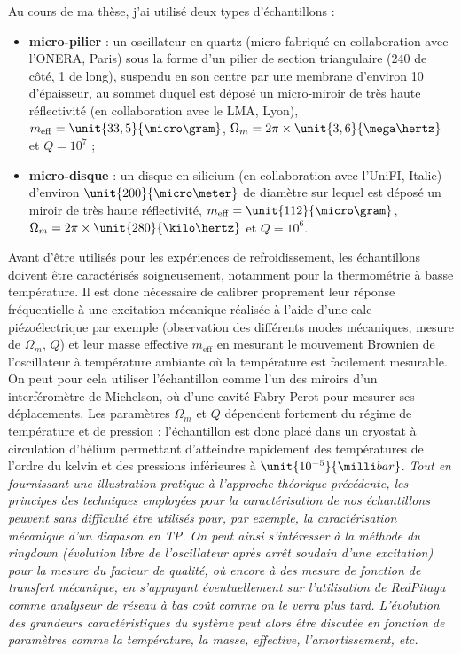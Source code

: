\documentclass[12pt,a4paper]{article}
\begin{document}
Au cours de ma thèse, j'ai utilisé deux types d'échantillons :
\begin{itemize}
\item \textbf{micro-pilier} : un oscillateur en quartz (micro-fabriqué en collaboration avec l'ONERA, Paris) sous la forme d'un pilier de section triangulaire (\unit{240}{\micro\meter} de côté, \unit{1}{\milli\meter} de long), suspendu en son centre par une membrane d'environ \unit{10}{\micro\meter} d'épaisseur, au sommet duquel est déposé un micro-miroir de très haute réflectivité (en collaboration avec le LMA, Lyon), $m_\mathrm{eff}=\unit{33,5}{\micro\gram}$, $\Omega_m=2\pi\times\unit{3,6}{\mega\hertz}$ et $Q=10^7$ ;
\item \textbf{micro-disque} : un disque en silicium (en collaboration avec l'UniFI, Italie) d'environ $\unit{200}{\micro\meter}$ de diamètre sur lequel est déposé un miroir de très haute réflectivité, $m_\mathrm{eff}=\unit{112}{\micro\gram}$, $\Omega_m=2\pi\times\unit{280}{\kilo\hertz}$ et $Q=10^6$.
\end{itemize}
Avant d'être utilisés pour les expériences de refroidissement, les échantillons doivent être caractérisés soigneusement, notamment pour la thermométrie à basse température.
Il est donc nécessaire de calibrer proprement leur réponse fréquentielle à une excitation mécanique réalisée à l'aide d'une cale piézoélectrique par exemple (observation des différents modes mécaniques, mesure de $\Omega_m$, $Q$) et leur masse effective $m_\mathrm{eff}$ en mesurant le mouvement Brownien de l'oscillateur à température ambiante où la température est facilement mesurable.
On peut pour cela utiliser l'échantillon comme l'un des miroirs d'un interféromètre de Michelson, où d'une cavité Fabry Perot pour mesurer ses déplacements.
Les paramètres $\Omega_m$ et $Q$ dépendent fortement du régime de température et de pression  : l'échantillon est donc placé dans un cryostat à circulation d'hélium permettant d'atteindre rapidement des températures de l'ordre du kelvin et des pressions inférieures à $\unit{10^{-5}}{\milli bar}$.
\emph{Tout en fournissant une illustration pratique à l'approche théorique précédente, les principes des techniques employées pour la caractérisation de nos échantillons peuvent sans difficulté être utilisés pour, par exemple, la caractérisation mécanique d'un diapason en TP.
On peut ainsi s'intéresser à la méthode du ringdown (évolution libre de l'oscillateur après arrêt soudain d'une excitation) pour la mesure du facteur de qualité, où encore à des mesure de fonction de transfert mécanique, en s'appuyant éventuellement sur l'utilisation de RedPitaya comme analyseur de réseau à bas coût comme on le verra plus tard.
L'évolution des grandeurs caractéristiques du système peut alors être discutée en fonction de paramètres comme la température, la masse, effective, l'amortissement, etc.}
\end{document}
